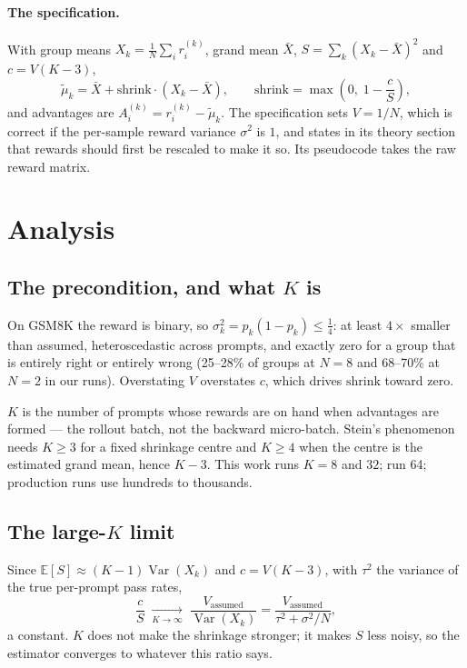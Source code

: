 \documentclass{article}
\newcommand{\shrink}{\mathrm{shrink}}
\newcommand{\E}{\mathbb{E}}
\newcommand{\Var}{\operatorname{Var}}
\begin{document}
\paragraph{The specification.} With group means $X_k=\frac1N\sum_i
r_i^{(k)}$, grand mean $\bar X$, $S=\sum_k(X_k-\bar X)^2$ and $c=V(K-3)$,
\begin{equation}
\tilde\mu_k=\bar X+\shrink\cdot(X_k-\bar X),\qquad
\shrink=\max\!\left(0,\;1-\frac{c}{S}\right),
\label{eq:js}
\end{equation}
and advantages are $A_i^{(k)}=r_i^{(k)}-\tilde\mu_k$. The specification sets
$V=1/N$, which is correct if the per-sample reward variance $\sigma^2$ is
$1$, and states in its theory section that rewards should first be rescaled
to make it so. Its pseudocode takes the raw reward matrix.

\section{Analysis}
\label{sec:analysis}

\subsection{The precondition, and what $K$ is}

On GSM8K the reward is binary, so $\sigma_k^2=p_k(1-p_k)\le\tfrac14$: at
least $4\times$ smaller than assumed, heteroscedastic across prompts, and
exactly zero for a group that is entirely right or entirely wrong (25--28\%
of groups at $N=8$ and 68--70\% at $N=2$ in our runs). Overstating $V$
overstates $c$, which drives $\shrink$ toward zero.

$K$ is the number of prompts whose rewards are on hand when advantages are
formed --- the rollout batch, not the backward micro-batch. Stein's
phenomenon needs $K\ge3$ for a fixed shrinkage centre and $K\ge4$ when the
centre is the estimated grand mean, hence $K-3$. This work runs $K=8$ and
$32$; \citet{zeng2025shrinking} run 64; production runs use hundreds to
thousands.

\subsection{The large-$K$ limit}

Since $\E[S]\approx(K-1)\Var(X_k)$ and $c=V(K-3)$, with $\tau^2$ the
variance of the true per-prompt pass rates,
\begin{equation}
\frac{c}{S}\;\xrightarrow[K\to\infty]{}\;
\frac{V_{\text{assumed}}}{\Var(X_k)}
=\frac{V_{\text{assumed}}}{\tau^2+\sigma^2/N},
\label{eq:limit}
\end{equation}
a constant. $K$ does not make the shrinkage stronger; it makes $S$ less
noisy, so the estimator converges to whatever this ratio says.
\end{document}
